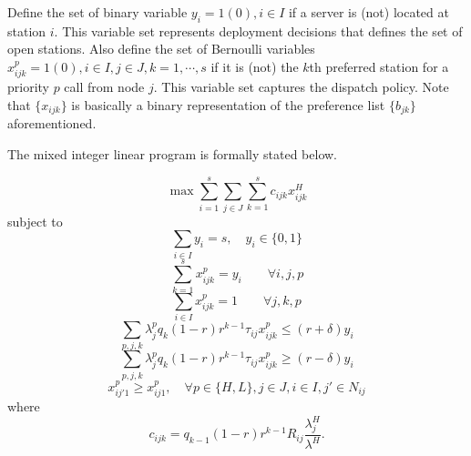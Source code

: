 \documentclass{article}
\begin{document}
Define the set of binary variable $y_i=1(0), i \in I $ if a server is (not) located at station $i$. This variable set represents deployment decisions that defines the set of open stations. Also define the set of Bernoulli variables $x^p_{ijk}=1(0), i \in I, j \in J, k=1,\cdots,s$ if it is (not) the $k$th preferred station for a priority $p$ call from node $j$. This variable set captures the dispatch policy. Note that $\{x_{ijk}\}$ is basically a binary representation of the preference list $\{b_{jk}\}$ aforementioned. 

The mixed integer linear program is formally stated below.

\begin{equation} \label{eq:obj}
\max \sum_{i=1}^s \sum_{j \in J} \sum_{k=1}^s c_{ijk} x^H_{ijk}
\end{equation}
subject to
\begin{equation} \label{eq:y}
\sum_{i \in I} y_i =s, \quad y_i \in \{ 0,1\}
\end{equation}
\begin{equation} \label{eq:xy}
\sum_{k=1}^s x_{ijk}^p  = y_i \qquad \forall i,j,p
\end{equation}
\begin{equation} \label{eq:x}
\sum_{i \in I} x_{ijk}^p = 1 \qquad \forall j,k,p
\end{equation}
\begin{equation} \label{eq:bal1}
\sum_{p,j,k} \lambda_{j}^{p} q_{k} (1-r)r^{k-1} \tau_{ij} x_{ijk}^p \leq (r+\delta) y_i
\end{equation}
\begin{equation} \label{eq:bal2}
\sum_{p,j,k} \lambda_{j}^{p} q_{k} (1-r)r^{k-1} \tau_{ij} x_{ijk}^p \geq (r-\delta) y_i
\end{equation}
\begin{equation} \label{eq:contiguity}
x_{ij'1}^p \geq x_{ij1}^p, \quad \forall p \in \{H,L\},  j \in J,i \in I, j' \in N_{ij}
\end{equation}
where
\begin{equation} \label{eq:coefficient}
c_{ijk}=q_{k-1}(1-r) r^{k-1} R_{ij} \frac{\lambda_j^H}{\lambda^H}.
\end{equation}
\end{document}
